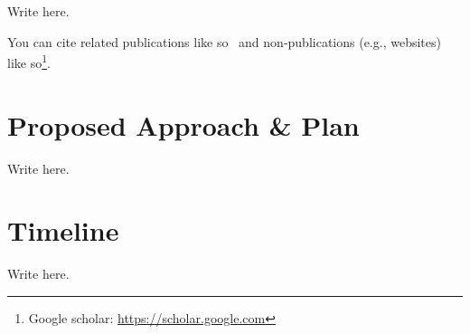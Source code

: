 \documentclass[11pt,letterpaper]{article}
\begin{document}
Write here.

You can cite related publications like so~\cite{vapnik1994measuring} and non-publications (e.g., websites) like so\footnote{Google scholar: \url{https://scholar.google.com}}.


\section{Proposed Approach \& Plan}

Write here.


\section{Timeline}

Write here.




\end{document}
